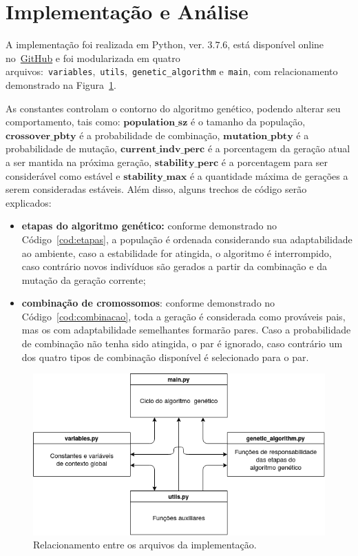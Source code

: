 \section{Implementação e Análise}
    \label{sec:exp}
A implementação foi realizada em Python, ver. $3.7.6$, está disponível online no~\hyperlink{https://github.com/rodrigofegui/IA-proj1}{GitHub} e foi modularizada em quatro arquivos:~\texttt{variables},~\texttt{utils},~\texttt{genetic\_algorithm} e~\texttt{main}, com relacionamento demonstrado na Figura~\ref{fig:exp_arqs}.

As constantes controlam o contorno do algoritmo genético, podendo alterar seu comportamento, tais como: $\mathbf{population\_sz}$ é o tamanho da população, $\mathbf{crossover\_pbty}$ é a probabilidade de combinação, $\mathbf{mutation\_pbty}$ é a probabilidade de mutação, $\mathbf{current\_indv\_perc}$ é a porcentagem da geração atual a ser mantida na próxima geração, $\mathbf{stability\_perc}$ é a porcentagem para ser considerável como estável e $\mathbf{stability\_max}$ é a quantidade máxima de gerações a serem consideradas estáveis. Além disso, alguns trechos de código serão explicados:

\begin{itemize}
    \item \textbf{etapas do algoritmo genético:} conforme demonstrado no Código~\ref{cod:etapas}, a população é ordenada considerando sua adaptabilidade ao ambiente, caso a estabilidade for atingida, o algoritmo é interrompido, caso contrário novos indivíduos são gerados a partir da combinação e da mutação da geração corrente;
    \item \textbf{combinação de cromossomos}: conforme demonstrado no Código~\ref{cod:combinacao}, toda a geração é considerada como prováveis pais, mas os com adaptabilidade semelhantes formarão pares. Caso a probabilidade de combinação não tenha sido atingida, o par é ignorado, caso contrário um dos quatro tipos de combinação disponível é selecionado para o par.
\end{itemize}

\begin{figure}[!h]
    \centering
    \includegraphics[width=\linewidth]{Imagens/Implementação_Diagrama.png}
    \caption{Relacionamento entre os arquivos da implementação.}
    \label{fig:exp_arqs}
\end{figure}

